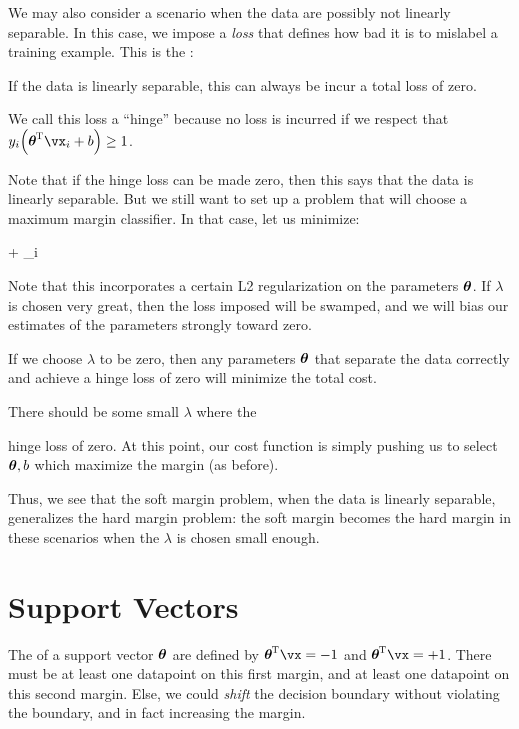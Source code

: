 \documentclass[11pt, oneside]{amsart}
\begin{document}
We may also consider a scenario when the data are possibly not linearly
separable. In this case, we impose a \emph{loss} that defines how bad it
is to mislabel a training example. This is the :

\begin{nedqn}
\end{nedqn}

If the data is linearly separable, this can always be incur a total loss
of zero.

We call this loss a ``hinge'' because no loss is incurred if we respect
that $y_i \parens{\vtheta\tran \vx_i + b} \geq 1$.

Note that if the hinge loss can be made zero, then this says that the
data is linearly separable. But we still want to set up a problem that
will choose a maximum margin classifier. In that case, let us minimize:

\begin{nedqn}
  \lambda \normsq{\vtheta} + \sum_i 
\end{nedqn}

\noindent
Note that this incorporates a certain L2 regularization on the
parameters $\bm{\mathrm{\theta}}$. If $\lambda$ is chosen very great, then the loss
imposed will be swamped, and we will bias our estimates of the
parameters strongly toward zero.

If we choose $\lambda$ to be zero, then any parameters $\bm{\mathrm{\theta}}$ that
separate the data correctly and achieve a hinge loss of zero will
minimize the total cost.

There should be some small $\lambda$ where the


hinge loss of zero. At this point, our cost function is simply pushing
us to select $\bm{\mathrm{\theta}}, b$ which maximize the margin (as before).

Thus, we see that the soft margin problem, when the data is linearly
separable, generalizes the hard margin problem: the soft margin becomes
the hard margin in these scenarios when the $\lambda$ is chosen small
enough.

\section{Support Vectors}

The  of a support vector $\bm{\mathrm{\theta}}$ are defined by
$\vtheta\tran \vx = -1$ and $\vtheta\tran \vx = +1$. There must be at
least one datapoint on this first margin, and at least one datapoint on
this second margin. Else, we could \emph{shift} the decision boundary
without violating the boundary, and in fact increasing the margin.
\end{document}
